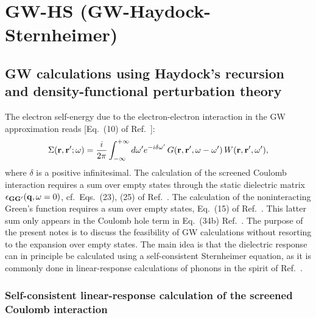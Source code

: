 \documentclass[12pt]{article}
\def\G{{\bf G}}
\def\Gp{{\bf G}^\prime}
\def\q{{\bf q}}
\def\r{{\bf r}}
\def\rp{{\bf r}^\prime}
\def\w{\omega}
\def\wp{\omega^\prime}
\begin{document}
\small

\section*{GW-HS (GW-Haydock-Sternheimer)}
\subsection*{GW calculations using Haydock's recursion and density-functional perturbation theory}
\newline

\noindent
The electron self-energy due to the electron-electron interaction in the GW approximation
reads [Eq.\ (10) of Ref.\ \cite{hl86}]:
  \begin{equation} \label{eq.sigma}
  \Sigma(\r,\rp;\w) = \frac{i}{2\pi} \int_{-\infty}^{+\infty} d\wp 
    e^{-i\delta\wp} \, G(\r,\rp,\w-\wp) \, W(\r,\rp,\wp),
  \end{equation}
where $\delta$ is a positive infinitesimal.
The calculation of the screened Coulomb interaction requires a sum over empty states
through the static dielectric matrix $\epsilon_{\G\Gp}(\q,\w=0)$, cf.\
Eqs.\ (23), (25) of Ref.\ \cite{hl86}.
The calculation of the noninteracting Green's function  requires a sum over empty states,
Eq.\ (15) of Ref.\ \cite{hl86}. This latter sum only appears in the Coulomb hole term
in Eq.\ (34b) Ref.\ \cite{hl86}.
The purpose of the present notes is to discuss the feasibility of GW calculations
without resorting to the expansion over empty states. The main idea is that
the dielectric response can in principle be calculated using a self-consistent 
Sternheimer equation, as it is commonly done in linear-response calculations of phonons 
in the spirit of Ref.\ \cite{baroni}.

\subsubsection*{Self-consistent linear-response calculation of the screened Coulomb interaction}
\end{document}
